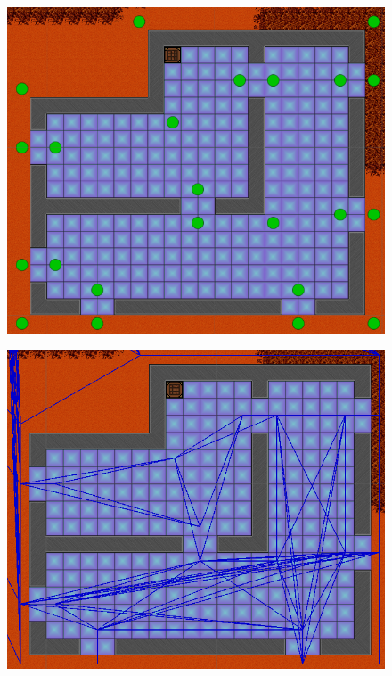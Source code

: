 \begin{figure}[H]
\centering
	\begin{minipage}{.5\textwidth}
		\centering
		\includegraphics[scale=0.3]{figures/astar/optimizedWaypoints}
		\label{waypointOpt}
	\end{minipage}%
	\begin{minipage}{.5\textwidth}
		\centering
		\includegraphics[scale=0.4]{figures/astar/optimizedWaypointsGraph}
		\label{waypointgraphOpt}
	\end{minipage}
\end{figure}

